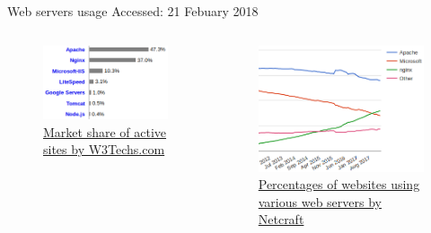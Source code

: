 \documentclass{beamer}
\begin{document}
\begin{frame}{Web servers usage}
	Accessed: 21 Febuary 2018
  \begin{columns}[T,onlytextwidth]
	  \vspace{2em}
	  \begin{figure}[t]
	    \includegraphics[scale=0.45]{images/w3techsWebServersUsage.png}
		  \caption{\href{https://w3techs.com/technologies/overview/web\_server/all}{Market share of active sites by W3Techs.com}}
	  \end{figure}
	  \begin{figure}[t]
	    \includegraphics[scale=0.4]{images/netcraftWebServersUsage.png}
		  \caption{\href{https://news.netcraft.com/archives/2018/02/13/february-2018-web-server-survey.html}{Percentages of websites using various web servers by Netcraft}}
	  \end{figure}
  \end{columns}
\end{frame}
\end{document}
